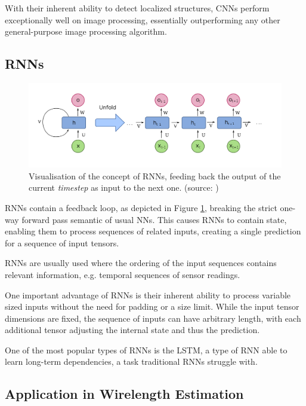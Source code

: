 With their inherent ability to detect localized structures, \glspl{CNN} perform exceptionally well on image processing, essentially outperforming any other general-purpose image processing algorithm\cite{dl-vs-cv}\cite{cv-vs-dl}.

\subsection{\glspl{RNN}}

\begin{figure}
	\includegraphics[width=\textwidth]{plots/recurrent-layer.png}
	\caption{Visualisation of the concept of \glspl{RNN}, feeding back the output of the current \textit{timestep} as input to the next one. (source: \cite{recurrent-layer-plot})}
	\label{fig:recurrent-layer}
\end{figure}

\glspl{RNN} contain a feedback loop, as depicted in Figure \ref{fig:recurrent-layer}, breaking the strict one-way forward pass semantic of usual \glspl{NN}. This causes \glspl{RNN} to contain state, enabling them to process sequences of related inputs, creating a single prediction for a sequence of input tensors.

\glspl{RNN} are usually used where the ordering of the input sequences contains relevant information, e.g. temporal sequences of sensor readings.

One important advantage of \glspl{RNN} is their inherent ability to process variable sized inputs without the need for padding or a size limit. While the input tensor dimensions are fixed, the sequence of inputs can have arbitrary length, with each additional tensor adjusting the internal state and thus the prediction.

One of the most popular types of \glspl{RNN} is the \gls{LSTM}\cite{lstm-paper}, a type of \gls{RNN} able to learn long-term dependencies, a task traditional \glspl{RNN} struggle with\cite{lstm-web}.

\subsection{Application in Wirelength Estimation}

